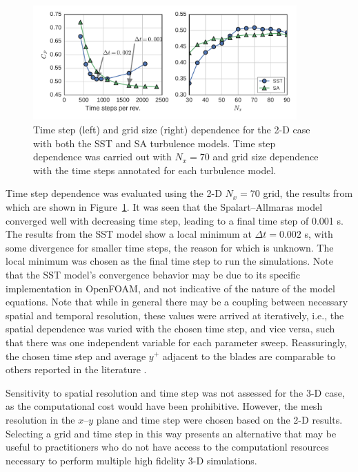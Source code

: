 \documentclass[aip,graphicx]{revtex4-1}
\begin{document}
\begin{figure}
    \centering

    \includegraphics[width=0.9\textwidth]{verification}

    \caption{Time step (left) and grid size (right) dependence for the 2-D case
    with both the SST and SA turbulence models. Time step dependence was carried
    out with $N_x=70$ and grid size dependence with the time steps annotated for
    each turbulence model.}

    \label{fig:2d-br-verification}
\end{figure}

Time step dependence was evaluated using the 2-D $N_x=70$ grid, the results from
which are shown in Figure~\ref{fig:2d-br-verification}. It was seen that the
Spalart--Allmaras model converged well with decreasing time step, leading to a
final time step of 0.001 s. The results from the SST model show a local minimum
at $\Delta t = 0.002$ s, with some divergence for smaller time steps, the reason
for which is unknown. The local minimum was chosen as the final time step to run
the simulations. Note that the SST model's convergence behavior may be due to
its specific implementation in OpenFOAM, and not indicative of the nature of the
model equations. Note that while in general there may be a coupling between
necessary spatial and temporal resolution, these values were arrived at
iteratively, i.e., the spatial dependence was varied with the chosen time step,
and vice versa, such that there was one independent variable for each parameter
sweep. Reassuringly, the chosen time step and average $y^+$ adjacent to the
blades are comparable to others reported in the literature
\cite{Maitre2013,Balduzzi2016}.

Sensitivity to spatial resolution and time step was not assessed for the 3-D
case, as the computational cost would have been prohibitive. However, the mesh
resolution in the $x$--$y$ plane and time step were chosen based on the 2-D
results. Selecting a grid and time step in this way presents an alternative that
may be useful to practitioners who do not have access to the computationl
resources necessary to perform multiple high fidelity 3-D simulations.
\end{document}
